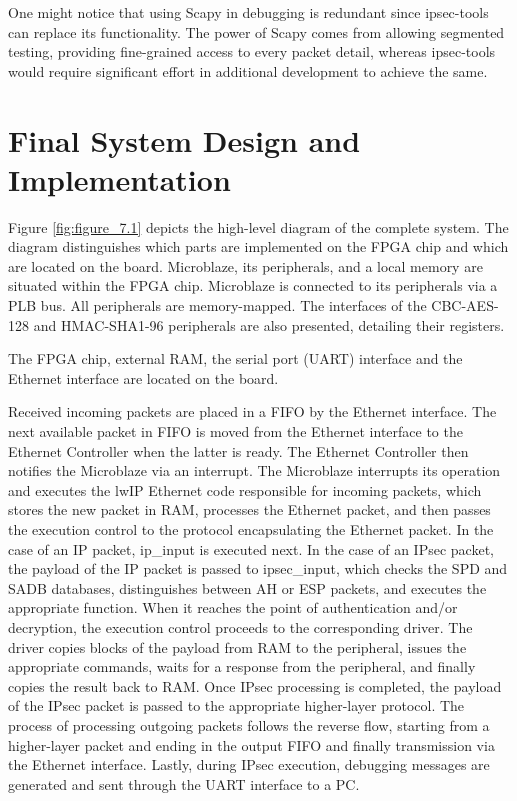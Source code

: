 One might notice that using Scapy in debugging is redundant since ipsec-tools can replace its functionality. The power of Scapy comes from allowing segmented testing, providing fine-grained access to every packet detail, whereas ipsec-tools would require significant effort in additional development to achieve the same. 

\section{Final System Design and Implementation}
Figure \ref{fig:figure_7.1} depicts the high-level diagram of the complete system. The diagram distinguishes which parts are implemented on the FPGA chip and which are located on the board. Microblaze, its peripherals, and a local memory are situated within the FPGA chip. Microblaze is connected to its peripherals via a PLB bus. All peripherals are memory-mapped. The interfaces of the CBC-AES-128 and HMAC-SHA1-96 peripherals are also presented, detailing their registers.

The FPGA chip, external RAM, the serial port (UART) interface and the Ethernet interface are located on the board.

Received incoming packets are placed in a FIFO by the Ethernet interface. The next available packet in FIFO is moved from the Ethernet interface to the Ethernet Controller when the latter is ready. The Ethernet Controller then notifies the Microblaze via an interrupt. The Microblaze interrupts its operation and executes the lwIP Ethernet code responsible for incoming packets, which stores the new packet in RAM, processes the Ethernet packet, and then passes the execution control to the protocol encapsulating the Ethernet packet. In the case of an IP packet, ip\_input is executed next. In the case of an IPsec packet, the payload of the IP packet is passed to ipsec\_input, which checks the SPD and SADB databases, distinguishes between AH or ESP packets, and executes the appropriate function. When it reaches the point of authentication and/or decryption, the execution control proceeds to the corresponding driver. The driver copies blocks of the payload from RAM to the peripheral, issues the appropriate commands, waits for a response from the peripheral, and finally copies the result back to RAM. Once IPsec processing is completed, the payload of the IPsec packet is passed to the appropriate higher-layer protocol. The process of processing outgoing packets follows the reverse flow, starting from a higher-layer packet and ending in the output FIFO and finally transmission via the Ethernet interface. Lastly, during IPsec execution, debugging messages are generated and sent through the UART interface to a PC.

